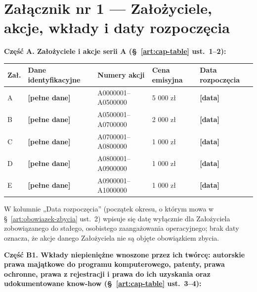 \documentclass[12pt,a4paper]{report}
\newcommand{\field}[1]{\textbf{[#1]}}
\begin{document}
\newpage

\section*{Załącznik nr 1 — Założyciele, akcje, wkłady i daty rozpoczęcia}

\textbf{Część A. Założyciele i akcje serii A (§~\ref{art:cap-table} ust.~1--2):}

\begin{center}
\begin{tabularx}{\linewidth}{@{}p{0.9cm} >{\raggedright\arraybackslash}X p{4.2cm} p{1.9cm} p{2.3cm}@{}}
\toprule
\textbf{Zał.} & \textbf{Dane identyfikacyjne} & \textbf{Numery akcji} & \textbf{Cena emisyjna} & \textbf{Data rozpoczęcia} \\
\midrule
A & \field{pełne dane} & A0000001--A0500000 & 5 000 zł & \field{data} \\
B & \field{pełne dane} & A0500001--A0700000 & 2 000 zł & \field{data} \\
C & \field{pełne dane} & A0700001--A0800000 & 1 000 zł & \field{data} \\
D & \field{pełne dane} & A0800001--A0900000 & 1 000 zł & \field{data} \\
E & \field{pełne dane} & A0900001--A1000000 & 1 000 zł & \field{data} \\
\bottomrule
\end{tabularx}
\end{center}

W kolumnie „Data rozpoczęcia” (początek okresu, o którym mowa w §~\ref{art:obowiazek-zbycia} ust.~2) wpisuje się datę wyłącznie dla Założyciela zobowiązanego do stałego, osobistego zaangażowania operacyjnego; brak daty oznacza, że akcje danego Założyciela nie są objęte obowiązkiem zbycia.

\textbf{Część B1. Wkłady niepieniężne wnoszone przez ich twórcę: autorskie prawa majątkowe do programu komputerowego, patenty, prawa ochronne, prawa z rejestracji i prawa do ich uzyskania oraz udokumentowane know-how (§~\ref{art:cap-table} ust.~3--4):}
\end{document}
